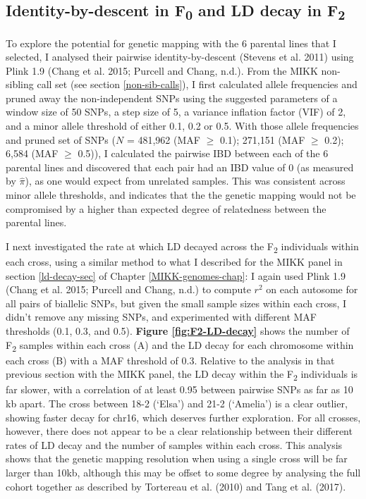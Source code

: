 \documentclass[
]{book}
\begin{document}
\hypertarget{identity-by-descent-in-f0-and-ld-decay-in-f2}{%
\subsection{\texorpdfstring{Identity-by-descent in F\textsubscript{0} and LD decay in F\textsubscript{2}}{Identity-by-descent in F0 and LD decay in F2}}\label{identity-by-descent-in-f0-and-ld-decay-in-f2}}

To explore the potential for genetic mapping with the 6 parental lines that I selected, I analysed their pairwise identity-by-descent (Stevens et al. 2011) using Plink 1.9 (Chang et al. 2015; Purcell and Chang, n.d.). From the MIKK non-sibling call set (see section \ref{non-sib-calls}), I first calculated allele frequencies and pruned away the non-independent SNPs using the suggested parameters of a window size of 50 SNPs, a step size of 5, a variance inflation factor (VIF) of 2, and a minor allele threshold of either 0.1, 0.2 or 0.5. With those allele frequencies and pruned set of SNPs (\(N\) = 481,962 (MAF \(\geq\) 0.1); 271,151 (MAF \(\geq\) 0.2); 6,584 (MAF \(\geq\) 0.5)), I calculated the pairwise IBD between each of the 6 parental lines and discovered that each pair had an IBD value of 0 (as measured by \(\hat{\pi}\)), as one would expect from unrelated samples. This was consistent across minor allele thresholds, and indicates that the the genetic mapping would not be compromised by a higher than expected degree of relatedness between the parental lines.

I next investigated the rate at which LD decayed across the F\textsubscript{2} individuals within each cross, using a similar method to what I described for the MIKK panel in section \ref{ld-decay-sec} of Chapter \ref{MIKK-genomes-chap}: I again used Plink 1.9 (Chang et al. 2015; Purcell and Chang, n.d.) to compute \(r^2\) on each autosome for all pairs of biallelic SNPs, but given the small sample sizes within each cross, I didn't remove any missing SNPs, and experimented with different MAF thresholds (0.1, 0.3, and 0.5). \textbf{Figure \ref{fig:F2-LD-decay}} shows the number of F\textsubscript{2} samples within each cross (A) and the LD decay for each chromosome within each cross (B) with a MAF threshold of 0.3. Relative to the analysis in that previous section with the MIKK panel, the LD decay within the F\textsubscript{2} individuals is far slower, with a correlation of at least 0.95 between pairwise SNPs as far as 10 kb apart. The cross between \textcolor{18-2 (‘Elsa’)_FF66A6}{18-2 (‘Elsa’)} and \textcolor{21-2 (‘Amelia’)_49B500}{21-2 (‘Amelia’)} is a clear outlier, showing faster decay for chr16, which deserves further exploration. For all crosses, however, there does not appear to be a clear relationship between their different rates of LD decay and the number of samples within each cross. This analysis shows that the genetic mapping resolution when using a single cross will be far larger than 10kb, although this may be offset to some degree by analysing the full cohort together as described by Tortereau et al. (2010) and Tang et al. (2017).
\end{document}

